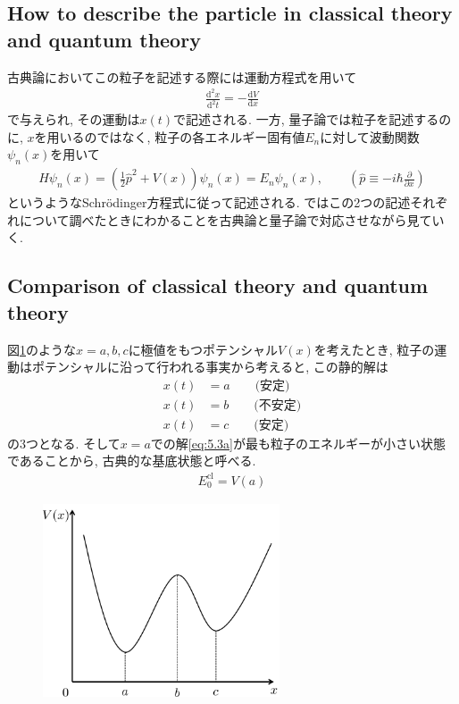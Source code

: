 \documentclass[dvipdfmx,11pt,a4paper,oneside,openany]{jsbook}
\begin{document}
\subsection{How to describe the particle in classical theory and quantum theory}
古典論においてこの粒子を記述する際には運動方程式を用いて
\begin{align}
    \frac{\mathrm{d^2}x}{\mathrm{d^2}t}=-\frac{\mathrm{d}V}{\mathrm{d}x}
\end{align}
で与えられ, その運動は$x(t)$で記述される. 一方, 量子論では粒子を記述するのに, $x$を用いるのではなく, 粒子の各エネルギー固有値$E_n$に対して波動関数$\psi_n(x)$を用いて
\begin{align}
    H\psi_n(x)=\left(\frac{1}{2}\hat{p}^2+V(x)\right)\psi_n(x)=E_n\psi_n(x), \qquad \left(\hat{p}\equiv -i\hbar\frac{\partial}{\partial x}\right)
\end{align}
というようなSchr\"{o}dinger方程式に従って記述される. ではこの2つの記述それぞれについて調べたときにわかることを古典論と量子論で対応させながら見ていく.

\subsection{Comparison of classical theory and quantum theory}
図\ref{fig1}のような$x=a, b, c$に極値をもつポテンシャル$V(x)$を考えたとき, 粒子の運動はポテンシャルに沿って行われる事実から考えると, この静的解は
\begin{subequations}
    \begin{align}
        x(t) & =a\qquad \text{(安定)}\label{eq:5.3a} \\
        x(t) & =b \qquad \text{(不安定)}             \\
        x(t) & =c \qquad \text{(安定)}
    \end{align}
\end{subequations}
の3つとなる. そして$x=a$での解\eqref{eq:5.3a}が最も粒子のエネルギーが小さい状態であることから, 古典的な基底状態と呼べる.
\begin{align}
    E_0^{\text{cl}}=V(a)
\end{align}

\setcounter{figure}{8}
\begin{figure}[H]
    \centering
    \includegraphics[width=7cm]{figure/fig1.png}
    \caption{}
    \label{fig1}
\end{figure}
\end{document}
